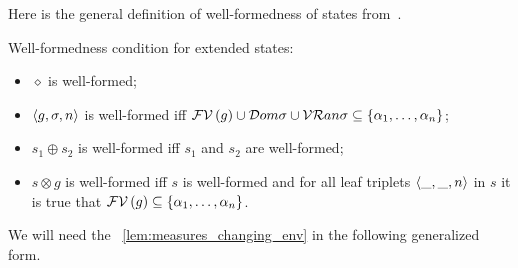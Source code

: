 Here is the general definition of well-formedness of states from~\cite{CertifiedSemantics}.

\begin{definition}
  Well-formedness condition for extended states:

  \begin{itemize}
  \item $\diamond$ is well-formed;
  \item $\left<{g, \sigma, n}\right>$ is well-formed iff $\mathcal{FV}\,({g})\cup\mathcal{D}om{\sigma}\cup\mathcal{VR}an{\sigma}\subseteq\{\alpha_1,\dots,\alpha_n\}$;
  \item $s_1\oplus s_2$ is well-formed iff $s_1$ and $s_2$ are well-formed;
  \item $s\otimes g$ is well-formed iff $s$ is well-formed and for all leaf triplets $\left<{\_,\_,n}\right>$ in $s$ it is true that $\mathcal{FV}\,({g})\subseteq\{\alpha_1,\dots,\alpha_n\}$.
  \end{itemize}

\end{definition}

We will need the \lemmaword~\ref{lem:measures_changing_env} in the following generalized form.

